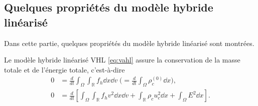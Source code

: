 
\subsection{Quelques propriétés du modèle hybride linéarisé}


Dans cette partie, quelques propriétés du modèle hybride linéarisé sont montrées. 
\begin{pro}\label{p:vhl_conservation}
  Le modèle hybride linéarisé VHL \eqref{eq:vahl} assure la conservation de la masse totale et de l'énergie totale, c'est-à-dire
  $$
    \begin{aligned}
      0 &= \frac{d}{dt}  \int_\Omega \int_{\mathbb{R}} f_h \dd{x}\dd{v} \; \Big( \! = \frac{d}{dt}  \int_\Omega \rho^{(0)}_c \dd{x}\Big), \\
      0 &= \frac{d}{dt} \left[ \int_\Omega \int_{\mathbb{R}} f_h v^2 \dd{x}\dd{v}+ \int_{\mathbb{R}} \rho_c u_c ^2 \dd{x}+  \int_\Omega E^2 \dd{x}\right].
    \end{aligned}
  $$
\end{pro}

